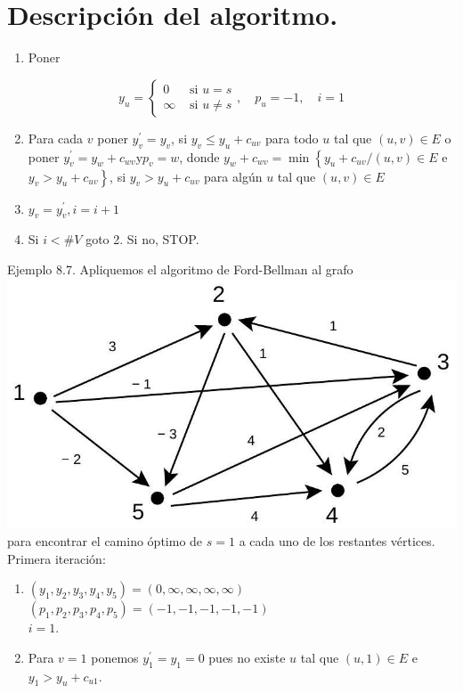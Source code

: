 \documentclass[10pt]{article}
\begin{document}
\section*{Descripción del algoritmo.}
\begin{enumerate}
  \item Poner
\end{enumerate}

$$
y_{u}=\left\{\begin{array}{ll}
0 & \text { si } u=s \\
\infty & \text { si } u \neq s
\end{array}, \quad p_{u}=-1, \quad i=1\right.
$$

\begin{enumerate}
  \setcounter{enumi}{1}
  \item Para cada $v$ poner $y_{v}^{\prime}=y_{v}$, si $y_{v} \leq y_{u}+c_{u v}$ para todo $u$ tal que $(u, v) \in E$ o poner $y_{v}^{\prime}=y_{w}+c_{w v} \mathrm{y} p_{v}=w$, donde $y_{w}+c_{w v}=\min \left\{y_{u}+c_{u v} /(u, v) \in E\right.$ e $\left.y_{v}>y_{u}+c_{u v}\right\}$, si $y_{v}>y_{u}+c_{u v}$ para algún $u$ tal que $(u, v) \in E$
  \item $y_{v}=y_{v}^{\prime}, i=i+1$
  \item Si $i<\# V$ goto 2. Si no, STOP.
\end{enumerate}

Ejemplo 8.7. Apliquemos el algoritmo de Ford-Bellman al grafo\\
\includegraphics[max width=\textwidth, center]{2025_09_05_93c7c1835f249f70c0eeg-34}\\
para encontrar el camino óptimo de $s=1$ a cada uno de los restantes vértices.\\
Primera iteración:

\begin{enumerate}
  \item $\left(y_{1}, y_{2}, y_{3}, y_{4}, y_{5}\right)=(0, \infty, \infty, \infty, \infty)$\\
$\left(p_{1}, p_{2}, p_{3}, p_{4}, p_{5}\right)=(-1,-1,-1,-1,-1)$\\
$i=1$.
  \item Para $v=1$ ponemos $y_{1}^{\prime}=y_{1}=0$ pues no existe $u$ tal que $(u, 1) \in E$ e $y_{1}>y_{u}+c_{u 1}$.
\end{enumerate}
\end{document}
